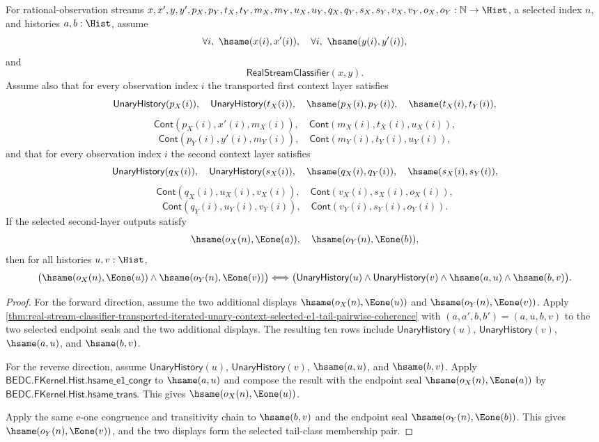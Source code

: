 \begin{theorem}
\label{thm:real-stream-classifier-transported-iterated-unary-context-selected-e1-tail-class-exactness}
For rational-observation streams
$x,x',y,y',p_X,p_Y,t_X,t_Y,m_X,m_Y,u_X,u_Y,q_X,q_Y,s_X,s_Y,v_X,v_Y,o_X,o_Y:
\mathbb{N}\to\Hist$, a selected index $n$, and histories $a,b:\Hist$, assume
$$
\forall i,\ \hsame(x(i),x'(i)),\quad
\forall i,\ \hsame(y(i),y'(i)),
$$
and
$$
\mathsf{RealStreamClassifier}(x,y).
$$
Assume also that for every observation index $i$ the transported first context
layer satisfies
$$
\mathsf{UnaryHistory}(p_X(i)),\quad \mathsf{UnaryHistory}(t_X(i)),\quad
\hsame(p_X(i),p_Y(i)),\quad \hsame(t_X(i),t_Y(i)),
$$
$$
\mathsf{Cont}(p_X(i),x'(i),m_X(i)),\quad
\mathsf{Cont}(m_X(i),t_X(i),u_X(i)),
$$
$$
\mathsf{Cont}(p_Y(i),y'(i),m_Y(i)),\quad
\mathsf{Cont}(m_Y(i),t_Y(i),u_Y(i)),
$$
and that for every observation index $i$ the second context layer satisfies
$$
\mathsf{UnaryHistory}(q_X(i)),\quad \mathsf{UnaryHistory}(s_X(i)),\quad
\hsame(q_X(i),q_Y(i)),\quad \hsame(s_X(i),s_Y(i)),
$$
$$
\mathsf{Cont}(q_X(i),u_X(i),v_X(i)),\quad
\mathsf{Cont}(v_X(i),s_X(i),o_X(i)),
$$
$$
\mathsf{Cont}(q_Y(i),u_Y(i),v_Y(i)),\quad
\mathsf{Cont}(v_Y(i),s_Y(i),o_Y(i)).
$$
If the selected second-layer outputs satisfy
$$
\hsame(o_X(n),\Eone(a)),\quad
\hsame(o_Y(n),\Eone(b)),
$$
then for all histories $u,v:\Hist$,
$$
\bigl(\hsame(o_X(n),\Eone(u))\land\hsame(o_Y(n),\Eone(v))\bigr)
\Longleftrightarrow
\bigl(\mathsf{UnaryHistory}(u)\land\mathsf{UnaryHistory}(v)\land
\hsame(a,u)\land\hsame(b,v)\bigr).
$$
\end{theorem}
\begin{proof}
For the forward direction, assume the two additional displays
$\hsame(o_X(n),\Eone(u))$ and $\hsame(o_Y(n),\Eone(v))$. Apply
\autoref{thm:real-stream-classifier-transported-iterated-unary-context-selected-e1-tail-pairwise-coherence}
with $(a,a',b,b')=(a,u,b,v)$ to the two selected endpoint seals and the two
additional displays. The resulting ten rows include
$\mathsf{UnaryHistory}(u)$, $\mathsf{UnaryHistory}(v)$, $\hsame(a,u)$, and
$\hsame(b,v)$.

For the reverse direction, assume $\mathsf{UnaryHistory}(u)$,
$\mathsf{UnaryHistory}(v)$, $\hsame(a,u)$, and $\hsame(b,v)$. Apply
$\mathsf{BEDC.FKernel.Hist.hsame\_e1\_congr}$ to $\hsame(a,u)$ and compose the
result with the endpoint seal $\hsame(o_X(n),\Eone(a))$ by
$\mathsf{BEDC.FKernel.Hist.hsame\_trans}$. This gives
$\hsame(o_X(n),\Eone(u))$.

Apply the same e-one congruence and transitivity chain to $\hsame(b,v)$ and
the endpoint seal $\hsame(o_Y(n),\Eone(b))$. This gives
$\hsame(o_Y(n),\Eone(v))$, and the two displays form the selected tail-class
membership pair.
\end{proof}

